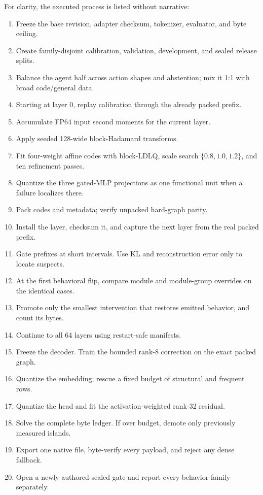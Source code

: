 \documentclass[10pt,twocolumn]{article}
\begin{document}
For clarity, the executed process is listed without narrative:

\begin{enumerate}
\item Freeze the base revision, adapter checksum, tokenizer, evaluator, and byte ceiling.
\item Create family-disjoint calibration, validation, development, and sealed release splits.
\item Balance the agent half across action shapes and abstention; mix it 1:1 with broad code/general data.
\item Starting at layer 0, replay calibration through the already packed prefix.
\item Accumulate FP64 input second moments for the current layer.
\item Apply seeded 128-wide block-Hadamard transforms.
\item Fit four-weight affine codes with block-LDLQ, scale search $\{0.8,1.0,1.2\}$, and ten refinement passes.
\item Quantize the three gated-MLP projections as one functional unit when a failure localizes there.
\item Pack codes and metadata; verify unpacked hard-graph parity.
\item Install the layer, checksum it, and capture the next layer from the real packed prefix.
\item Gate prefixes at short intervals. Use KL and reconstruction error only to locate suspects.
\item At the first behavioral flip, compare module and module-group overrides on the identical cases.
\item Promote only the smallest intervention that restores emitted behavior, and count its bytes.
\item Continue to all 64 layers using restart-safe manifests.
\item Freeze the decoder. Train the bounded rank-8 correction on the exact packed graph.
\item Quantize the embedding; rescue a fixed budget of structural and frequent rows.
\item Quantize the head and fit the activation-weighted rank-32 residual.
\item Solve the complete byte ledger. If over budget, demote only previously measured islands.
\item Export one native file, byte-verify every payload, and reject any dense fallback.
\item Open a newly authored sealed gate and report every behavior family separately.
\end{enumerate}
\end{document}
